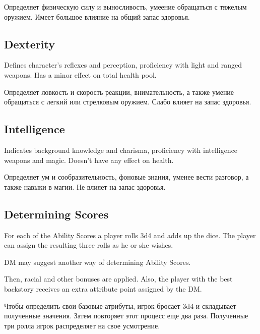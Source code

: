 \documentclass[a5paper,11pt]{book}
\begin{document}
\begin{multicols}{2}
\begin{ru}
Определяет физическую силу и выносливость, умеение обращаться с тяжелым оружием. Имеет большое влияние на общий запас здоровья.
\end{ru}

\subsection{Dexterity}
\begin{en}
Defines character's reflexes and perception, proficiency with light and ranged weapons. Has a minor effect on total health pool.
\end{en}

\begin{ru}
Определяет ловкость и скорость реакции, внимательность, а также умение обращаться с легкий или стрелковым оружием. Слабо влияет на запас здоровья.
\end{ru}

\subsection{Intelligence}
\begin{en}
Indicates background knowledge and charisma, proficiency with intelligence weapons and magic. Doesn't have any effect on health.
\end{en}

\begin{ru}
Определяет ум и сообразительность, фоновые знания, уменее вести разговор, а также навыки в магии. Не влияет на запас здоровья.
\end{ru}

\subsection{Determining Scores}
\begin{en}
For each of the Ability Scores a player rolls 3d4 and adds up the dice. The player can assign the resulting three rolls as he or she wishes.

DM may suggest another way of determining Ability Scores.

Then, racial and other bonuses are applied. Also, the player with the best backstory receives an extra attribute point assigned by the DM.
\end{en}

\begin{ru}
Чтобы определить свои базовые атрибуты, игрок бросает 3d4 и складывает полученные значения. Затем повторяет этот процесс еще два раза. Полученные три ролла игрок распределяет на свое усмотрение.


\end{ru}
\end{multicols}
\end{document}
